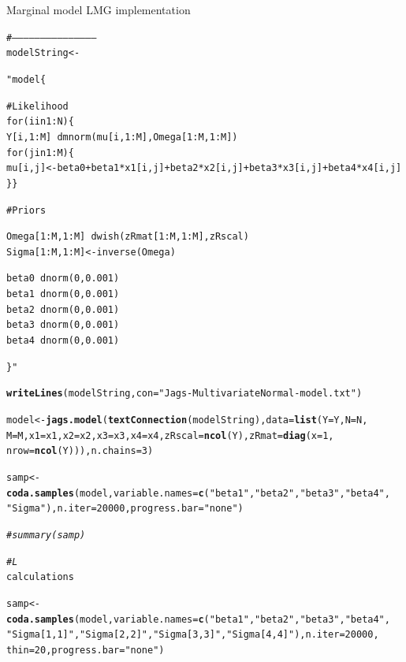 \documentclass[11pt,a4paper,twoside]{book}\usepackage[]{graphicx}\usepackage[]{color}
\makeatletter
\newcommand{\hlnum}[1]{\textcolor[rgb]{0.686,0.059,0.569}{#1}}%
\newcommand{\hlstr}[1]{\textcolor[rgb]{0.192,0.494,0.8}{#1}}%
\newcommand{\hlcom}[1]{\textcolor[rgb]{0.678,0.584,0.686}{\textit{#1}}}%
\newcommand{\hlstd}[1]{\textcolor[rgb]{0.345,0.345,0.345}{#1}}%
\newcommand{\hlkwb}[1]{\textcolor[rgb]{0.69,0.353,0.396}{#1}}%
\newcommand{\hlkwc}[1]{\textcolor[rgb]{0.333,0.667,0.333}{#1}}%
\newcommand{\hlkwd}[1]{\textcolor[rgb]{0.737,0.353,0.396}{\textbf{#1}}}%
\newenvironment{kframe}{%
 \def\at@end@of@kframe{}%
 \ifinner\ifhmode%
  \def\at@end@of@kframe{\end{minipage}}%
  \begin{minipage}{\columnwidth}%
 \fi\fi%
 \def\FrameCommand##1{\hskip\@totalleftmargin \hskip-\fboxsep
 \colorbox{shadecolor}{##1}\hskip-\fboxsep
     \hskip-\linewidth \hskip-\@totalleftmargin \hskip\columnwidth}%
 \MakeFramed {\advance\hsize-\width
   \@totalleftmargin\z@ \linewidth\hsize
   \@setminipage}}%
 {\par\unskip\endMakeFramed%
 \at@end@of@kframe}
\newenvironment{knitrout}{}{} %
\makeatother
\begin{document}
		\begin{codeenv}
		
\caption{Marginal model LMG implementation}\label{r04:model.unstruct}
\begin{knitrout}
\color{fgcolor}\begin{kframe}
\begin{alltt}
\hlcom{#--------------------------------------------}
\hlstd{modelString} \hlkwb{<-} \hlstr{"model\{

# Likelihood
for(i in 1:N)\{
Y[i,1:M] ~ dmnorm(mu[i,1:M],Omega[1:M,1:M])
for(j in 1:M)\{
mu[i,j] <- beta0 + beta1*x1[i,j]+ beta2*x2[i,j]+ beta3*x3[i,j] + beta4*x4[i,j]  
\}\}

# Priors

Omega[1:M, 1:M] ~dwish(zRmat[1:M,1:M] , zRscal)
Sigma[1:M, 1:M] <- inverse(Omega)

beta0      ~ dnorm(0,0.001)
beta1      ~ dnorm(0,0.001)
beta2      ~ dnorm(0,0.001)
beta3      ~ dnorm(0,0.001)
beta4      ~ dnorm(0,0.001)

\}"}

\hlkwd{writeLines}\hlstd{(modelString,} \hlkwc{con} \hlstd{=} \hlstr{"Jags-MultivariateNormal-model.txt"}\hlstd{)}

\hlstd{model} \hlkwb{<-} \hlkwd{jags.model}\hlstd{(}\hlkwd{textConnection}\hlstd{(modelString),} \hlkwc{data} \hlstd{=} \hlkwd{list}\hlstd{(}\hlkwc{Y} \hlstd{= Y,} \hlkwc{N} \hlstd{= N,}
    \hlkwc{M} \hlstd{= M,} \hlkwc{x1} \hlstd{= x1,} \hlkwc{x2} \hlstd{= x2,} \hlkwc{x3} \hlstd{= x3,} \hlkwc{x4} \hlstd{= x4,} \hlkwc{zRscal} \hlstd{=} \hlkwd{ncol}\hlstd{(Y),} \hlkwc{zRmat} \hlstd{=} \hlkwd{diag}\hlstd{(}\hlkwc{x} \hlstd{=} \hlnum{1}\hlstd{,}
        \hlkwc{nrow} \hlstd{=} \hlkwd{ncol}\hlstd{(Y))),} \hlkwc{n.chains} \hlstd{=} \hlnum{3}\hlstd{)}

\hlstd{samp} \hlkwb{<-} \hlkwd{coda.samples}\hlstd{(model,} \hlkwc{variable.names} \hlstd{=} \hlkwd{c}\hlstd{(}\hlstr{"beta1"}\hlstd{,} \hlstr{"beta2"}\hlstd{,} \hlstr{"beta3"}\hlstd{,} \hlstr{"beta4"}\hlstd{,}
    \hlstr{"Sigma"}\hlstd{),} \hlkwc{n.iter} \hlstd{=} \hlnum{20000}\hlstd{,} \hlkwc{progress.bar} \hlstd{=} \hlstr{"none"}\hlstd{)}

\hlcom{# summary(samp)}

\hlcom{# L}
 \hlstd{calculations}

\hlstd{samp} \hlkwb{<-} \hlkwd{coda.samples}\hlstd{(model,} \hlkwc{variable.names} \hlstd{=} \hlkwd{c}\hlstd{(}\hlstr{"beta1"}\hlstd{,} \hlstr{"beta2"}\hlstd{,} \hlstr{"beta3"}\hlstd{,} \hlstr{"beta4"}\hlstd{,}
    \hlstr{"Sigma[1,1]"}\hlstd{,} \hlstr{"Sigma[2,2]"}\hlstd{,} \hlstr{"Sigma[3,3]"}\hlstd{,} \hlstr{"Sigma[4,4]"}\hlstd{),} \hlkwc{n.iter} \hlstd{=} \hlnum{20000}\hlstd{,}
    \hlkwc{thin} \hlstd{=} \hlnum{20}\hlstd{,} \hlkwc{progress.bar} \hlstd{=} \hlstr{"none"}\hlstd{)}


\end{alltt}
\end{kframe}
\end{knitrout}
\end{codeenv}
\end{document}
